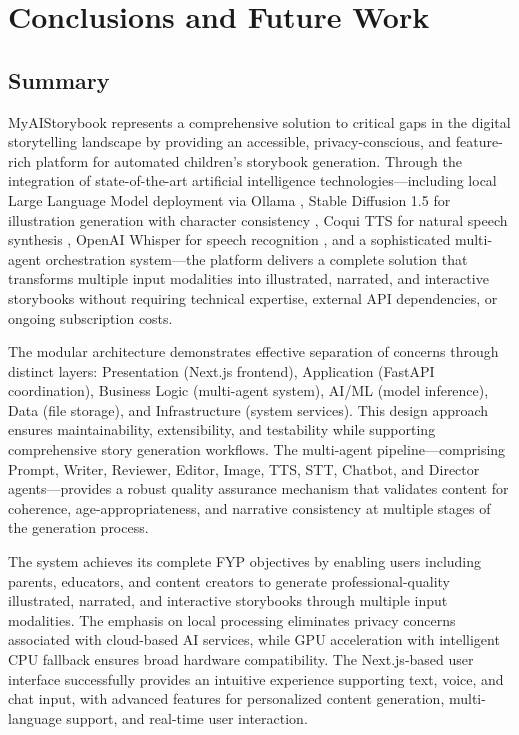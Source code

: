 \chapter{Conclusions and Future Work}
\label{sec:conclusions}

\section{Summary}
MyAIStorybook represents a comprehensive solution to critical gaps in the digital storytelling landscape by providing an accessible, privacy-conscious, and feature-rich platform for automated children's storybook generation. Through the integration of state-of-the-art artificial intelligence technologies—including local Large Language Model deployment via Ollama \cite{ollama2024}, Stable Diffusion 1.5 for illustration generation with character consistency \cite{rombach2022highresolution}, Coqui TTS for natural speech synthesis \cite{coqui2024}, OpenAI Whisper for speech recognition \cite{whisper2023}, and a sophisticated multi-agent orchestration system—the platform delivers a complete solution that transforms multiple input modalities into illustrated, narrated, and interactive storybooks without requiring technical expertise, external API dependencies, or ongoing subscription costs.

The modular architecture demonstrates effective separation of concerns through distinct layers: Presentation (Next.js frontend), Application (FastAPI coordination), Business Logic (multi-agent system), AI/ML (model inference), Data (file storage), and Infrastructure (system services). This design approach ensures maintainability, extensibility, and testability while supporting comprehensive story generation workflows. The multi-agent pipeline—comprising Prompt, Writer, Reviewer, Editor, Image, TTS, STT, Chatbot, and Director agents—provides a robust quality assurance mechanism that validates content for coherence, age-appropriateness, and narrative consistency at multiple stages of the generation process.

The system achieves its complete FYP objectives by enabling users including parents, educators, and content creators to generate professional-quality illustrated, narrated, and interactive storybooks through multiple input modalities. The emphasis on local processing eliminates privacy concerns associated with cloud-based AI services, while GPU acceleration with intelligent CPU fallback ensures broad hardware compatibility. The Next.js-based user interface successfully provides an intuitive experience supporting text, voice, and chat input, with advanced features for personalized content generation, multi-language support, and real-time user interaction.

